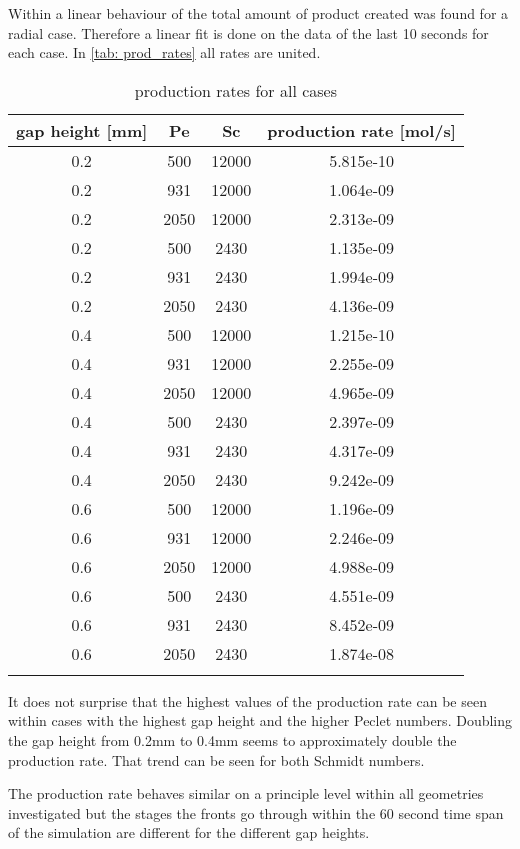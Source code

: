 \documentclass[../thesis.tex]{subfiles}
\begin{document}
Within \cite{brau2020influence} a linear behaviour of the total amount of product created was found for a radial case. Therefore a linear fit is done on the data of the last 10 seconds for each case. In \autoref{tab: prod_rates} all rates are united.
\begin{table} [htbp]
	\centering
	\caption{production rates for all cases}
	\begin{tabular}{ cccc }
		\hline
		gap height [mm] & Pe & Sc & production rate [mol/s] \\
		\hline
		0.2 & 500 & 12000 & 5.815e-10 \\
		0.2 & 931 & 12000 & 1.064e-09 \\
		0.2 & 2050 & 12000 & 2.313e-09 \\
		0.2	& 500 & 2430 & 1.135e-09 \\
		0.2	& 931 & 2430 & 1.994e-09 \\
		0.2	& 2050 & 2430 & 4.136e-09 \\
		0.4 & 500 & 12000 & 1.215e-10 \\
		0.4 & 931 & 12000 & 2.255e-09 \\
		0.4 & 2050 & 12000 & 4.965e-09 \\
		0.4	& 500 & 2430 & 2.397e-09 \\
		0.4	& 931 & 2430 & 4.317e-09 \\
		0.4	& 2050 & 2430 & 9.242e-09 \\
		0.6 & 500 & 12000 & 1.196e-09 \\
		0.6 & 931 & 12000 & 2.246e-09 \\
		0.6 & 2050 & 12000 & 4.988e-09 \\
		0.6	& 500 & 2430 & 4.551e-09 \\
		0.6	& 931 & 2430 & 8.452e-09 \\
		0.6	& 2050 & 2430 & 1.874e-08 \\
		\hline
		\label{tab: prod_rates}
	\end{tabular}
\end{table}
It does not surprise that the highest values of the production rate can be seen within cases with the highest gap height and the higher Peclet numbers. Doubling the gap height from 0.2mm to 0.4mm seems to approximately double the production rate. That trend can be seen for both Schmidt numbers.
\newline

The production rate behaves similar on a principle level within all geometries investigated but the stages the fronts go through within the 60 second time span of the simulation are different for the different gap heights. 
\end{document}
